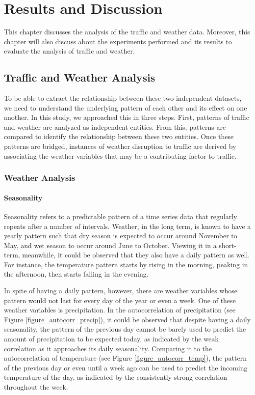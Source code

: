 \chapter{Results and Discussion}

This chapter discusses the analysis of the traffic and weather data. Moreover, this chapter will also discuss about the experiments performed and its results to evaluate the analysis of traffic and weather.

\section{Traffic and Weather Analysis}

To be able to extract the relationship between these two independent datasets, we need to understand the underlying pattern of each other and its effect on one another. In this study, we approached this in three steps. First, patterns of traffic and weather are analyzed as independent entities. From this, patterns are compared to identify the relationship between these two entities. Once these patterns are bridged, instances of weather disruption to traffic are derived by associating the weather variables that may be a contributing factor to traffic.





\subsection{Weather Analysis}

\subsubsection{Seasonality}

Seasonality refers to a predictable pattern of a time series data that regularly repeats after a number of intervals. Weather, in the long term, is known to have a yearly pattern such that dry season is expected to occur around November to May, and wet season to occur around June to October. Viewing it in a short-term, meanwhile, it could be observed that they also have a daily pattern as well. For instance, the temperature pattern starts by rising in the morning, peaking in the afternoon, then starts falling in the evening.

	In spite of having a daily pattern, however, there are weather variables whose pattern would not last for every day of the year or even a week. One of these weather variables is precipitation. In the autocorrelation of precipitation (see Figure \ref{figure_autocorr_precip}), it could be observed that despite having a daily seasonality, the pattern of the previous day cannot be barely used to predict the amount of precipitation to be expected today, as indicated by the weak correlation as it approaches its daily seasonality. Comparing it to the autocorrelation of temperature (see Figure \ref{figure_autocorr_temp}), the pattern of the previous day or even until a week ago can be used to predict the incoming temperature of the day, as indicated by the consistently strong correlation throughout the week.



